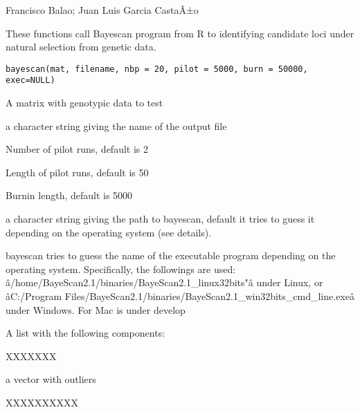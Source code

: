 \documentclass[letterpaper]{book}
\begin{document}
%
\begin{Author}\relax
Francisco Balao; Juan Luis Garcia CastaÃ±o
\end{Author}
%
\begin{Description}\relax
These functions call Bayescan program from R to identifying candidate loci under natural selection from genetic data.
\end{Description}
%
\begin{Usage}
\begin{verbatim}
bayescan(mat, filename, nbp = 20, pilot = 5000, burn = 50000, exec=NULL)

\end{verbatim}
\end{Usage}
%
\begin{Arguments}
\begin{ldescription}
\item[\code{mat}] 
A matrix with genotypic data to test

\item[\code{filename}] 
a character string giving the name of the output file

\item[\code{nbp}] 
Number of pilot runs, default is 2 

\item[\code{pilot}] 
Length of pilot runs, default is 50

\item[\code{burn}] 
Burnin length, default is 5000

\item[\code{exec}] 
a character string giving the path to bayescan, default it tries to guess it depending on the operating system (see details).

\end{ldescription}
\end{Arguments}
%
\begin{Details}\relax
bayescan tries to guess the name of the executable program depending on the operating system. Specifically, the followings are used: â/home/BayeScan2.1/binaries/BayeScan2.1\_linux32bits"â under Linux, or âC:/Program Files/BayeScan2.1/binaries/BayeScan2.1\_win32bits\_cmd\_line.exeâ under Windows. For Mac is under develop
\end{Details}
%
\begin{Value}
A list with the following components:
\begin{ldescription}
\item[\code{resultfst}] XXXXXXX
\item[\code{outliers}] a vector with outliers
\item[\code{TP}] XXXXXXXXXX
\end{ldescription}
\end{Value}
\end{document}
